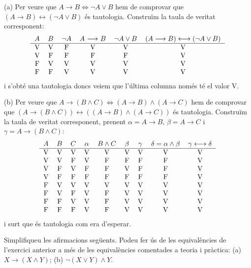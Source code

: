 \begin{solucio}
(a) Per veure que $A\longrightarrow B\Longleftrightarrow\lnot A\vee B$ hem de
comprovar que $(A\longrightarrow B)\longleftrightarrow\left(  \lnot A\vee
B\right)  $ és tautologia. Construïm la taula de veritat
corresponent:%
\[%
\begin{tabular}
[c]{cccccc}%
$A$ & $B$ & $\lnot A$ & $A$ $\longrightarrow$ $B$ & $\lnot A\vee B$ &
$(A\longrightarrow B)\longleftrightarrow\left(  \lnot A\vee B\right)
$\\\hline
V & V & F & V & V & V\\
V & F & F & F & F & V\\
F & V & V & V & V & V\\
F & F & V & V & V & V
\end{tabular}
\]
i s'obté una tautologia doncs veiem que l'última columna només
té el valor V.

(b) Per veure que $A\longrightarrow\left(  B\wedge C\right)
\Longleftrightarrow\left(  A\longrightarrow B\right)  \wedge\left(
A\longrightarrow C\right)  $ hem de comprovar que $(A\longrightarrow\left(
B\wedge C\right)  )\longleftrightarrow\left(  \left(  A\longrightarrow
B\right)  \wedge\left(  A\longrightarrow C\right)  \right)  $ és
tautologia. Construïm la taula de veritat corresponent, prenent
$\alpha=A\longrightarrow B$, $\beta=A\longrightarrow C$ i $\gamma
=A\longrightarrow\left(  B\wedge C\right)  $:
\[%
\begin{tabular}
[c]{ccccccccc}%
$A$ & $B$ & $C$ & $\alpha$ & $B\wedge C$ & $\beta$ & $\gamma$ & $\delta
=\alpha\wedge\beta$ & $\gamma\longleftrightarrow\delta$\\\hline
V & V & V & V & V & V & V & V & V\\
V & V & F & V & F & F & F & F & V\\
V & F & V & F & F & V & F & F & V\\
V & F & F & F & F & F & F & F & V\\
F & V & V & V & V & V & V & V & V\\
F & V & F & V & F & V & V & V & V\\
F & F & V & V & F & V & V & V & V\\
F & F & F & V & F & V & V & V & V
\end{tabular}
\]
i surt que és tautologia com era d'esperar.
\end{solucio}

\begin{exercici}
Simplifiqueu les afirmacions següents. Podeu fer ús de les
equivalències de l'exercici anterior a més de les equivalències
comentades a teoria i pràctica: (a) $X\longrightarrow\left(  X\wedge
Y\right)  $; (b) $\lnot\left(  X\vee Y\right)  \wedge Y$.
\end{exercici}

